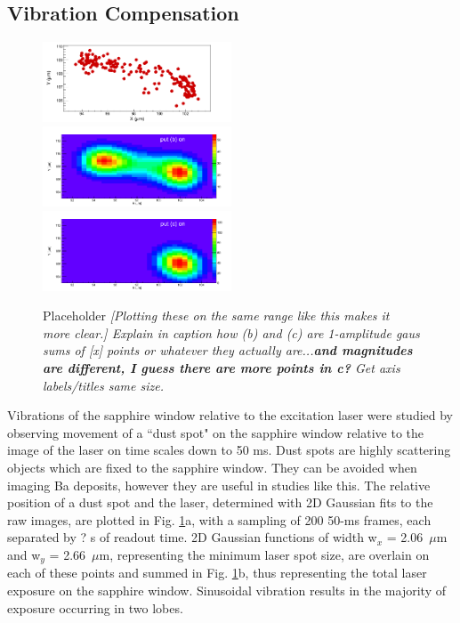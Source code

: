 \documentclass[aps,pra,reprint,superscriptaddress]{revtex4-1}
\begin{document}


\subsection{Vibration Compensation}
\label{subsec:vibes}

\begin{figure}
\includegraphics[width=0.5\textwidth]{figures/vibes_a.png}
~
\includegraphics[width=0.5\textwidth]{figures/vibes_b.png}
~
\includegraphics[width=0.5\textwidth]{figures/vibes_c.png}
\caption{Placeholder \emph{[Plotting these on the same range like this makes it more clear.] Explain in caption how (b) and (c) are 1-amplitude gaus sums of [x] points or whatever they actually are...\textbf{and magnitudes are different, I guess there are more points in c?} Get axis labels/titles same size.}}
\label{fig:vibes}
\end{figure}

Vibrations of the sapphire window relative to the excitation laser were studied by observing movement of a ``dust spot" on the sapphire window relative to the image of the laser on time scales down to 50 ms.  Dust spots are highly scattering objects which are fixed to the sapphire window.  They can be avoided when imaging Ba deposits, however they are useful in studies like this.  The relative position of a dust spot and the laser, determined with 2D Gaussian fits to the raw images, are plotted in Fig. \ref{fig:vibes}a, with a sampling of {\color{gray}200 50-}ms frames, each separated by {\color{gray}?} s of readout time.  2D Gaussian functions of width w$_{x}$ = 2.06~$\mu$m and w$_{y}$ = 2.66~$\mu$m, representing the minimum laser spot size, are overlain on each of these points and summed in Fig. \ref{fig:vibes}b, thus representing the total laser exposure on the sapphire window.  Sinusoidal vibration results in the majority of exposure occurring in two lobes.
\end{document}
